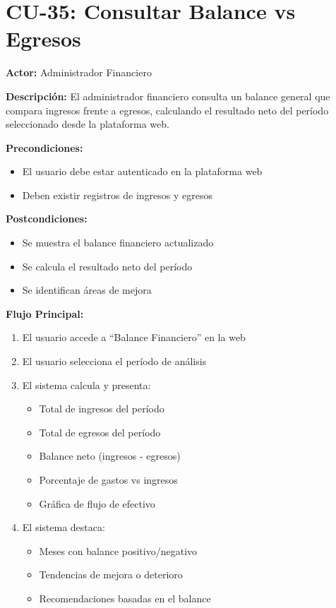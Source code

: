 \section{CU-35: Consultar Balance vs Egresos}

\noindent\textbf{Actor:} Administrador Financiero

\noindent\textbf{Descripción:} El administrador financiero consulta un balance general que compara ingresos frente a egresos, calculando el resultado neto del período seleccionado desde la plataforma web.

\noindent\textbf{Precondiciones:}
\begin{itemize}
    \item El usuario debe estar autenticado en la plataforma web
    \item Deben existir registros de ingresos y egresos
\end{itemize}

\noindent\textbf{Postcondiciones:}
\begin{itemize}
    \item Se muestra el balance financiero actualizado
    \item Se calcula el resultado neto del período
    \item Se identifican áreas de mejora
\end{itemize}

\noindent\textbf{Flujo Principal:}
\begin{enumerate}
    \item El usuario accede a ``Balance Financiero'' en la web
    \item El usuario selecciona el período de análisis
    \item El sistema calcula y presenta:
    \begin{itemize}
        \item Total de ingresos del período
        \item Total de egresos del período
        \item Balance neto (ingresos - egresos)
        \item Porcentaje de gastos vs ingresos
        \item Gráfica de flujo de efectivo
    \end{itemize}
    \item El sistema destaca:
    \begin{itemize}
        \item Meses con balance positivo/negativo
        \item Tendencias de mejora o deterioro
        \item Recomendaciones basadas en el balance
    \end{itemize}
\end{enumerate}

